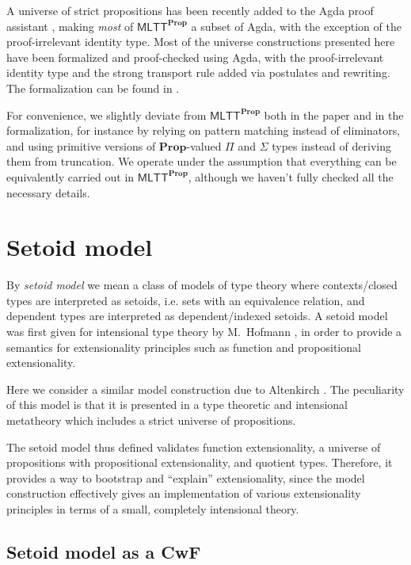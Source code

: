 \documentclass[autoref]{llncs}
\newcommand{\mlttp}{\textsf{MLTT}^{\mProp}}
\newcommand{\mProp}{\mathbf{Prop}}
\begin{document}
A universe of strict propositions has been recently added to the Agda proof
assistant \cite{agda-prop}, making \emph{most} of $\mlttp$ a subset of Agda,
with the exception of the proof-irrelevant identity type. Most of the universe
constructions presented here have been formalized and proof-checked using Agda,
with the proof-irrelevant identity type and the strong transport rule added via
postulates and rewriting. The formalization can be found in \cite{agda-code}.

For convenience, we slightly deviate from $\mlttp$ both in the paper and in the
formalization, for instance by relying on pattern matching instead of
eliminators, and using primitive versions of $\mProp$-valued $\Pi$ and $\Sigma$
types instead of deriving them from truncation. We operate under the assumption
that everything can be equivalently carried out in $\mlttp$, although we haven't
fully checked all the necessary details.

\section{Setoid model}\label{sec:setoid-model}

By \emph{setoid model} we mean a class of models of type theory where
contexts/closed types are interpreted as setoids, i.e. sets with an equivalence
relation, and dependent types are interpreted as dependent/indexed setoids.
%
A setoid model was first given for intensional type theory by M.\ Hofmann
\cite{hofmann}, in order to provide a semantics for extensionality principles such
as function and propositional extensionality.

Here we consider a similar model construction due to Altenkirch
\cite{setoid99}. The peculiarity of this model is that it is presented in a type
theoretic and intensional metatheory which includes a strict universe of
propositions.

The setoid model thus defined validates function extensionality, a universe of
propositions with propositional extensionality, and quotient types. Therefore,
it provides a way to bootstrap and ``explain'' extensionality, since the model
construction effectively gives an implementation of various extensionality
principles in terms of a small, completely intensional theory.

\subsection{Setoid model as a CwF}
\end{document}
